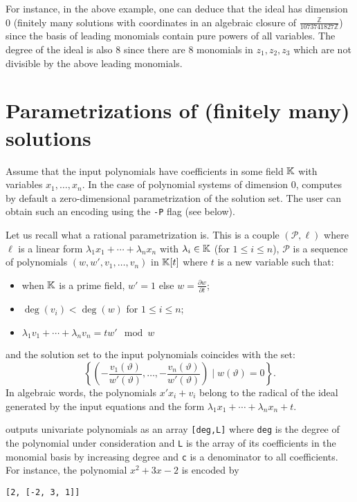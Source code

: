 \documentclass[a4paper,english,11pt]{scrartcl}
\theoremstyle{definition}
\theoremstyle{remark}
\def\leq{\leqslant}
\begin{document}
For instance, in the above example, one can deduce that the ideal has dimension
$0$ (finitely many solutions with coordinates in an algebraic closure of
$\frac{\mathbb{Z}}{1073741827\mathbb{Z}}$) since the basis of leading monomials
contain pure powers of all variables. The degree of the ideal is also $8$ since
there are $8$ monomials in $z_1, z_2, z_3$ which are not divisible by the above
leading monomials.

\section{Parametrizations of (finitely many) solutions}

Assume that the input polynomials have coefficients in some field $\mathbb{K}$ with
variables $x_1, \ldots, x_n$. In the case of polynomial systems of dimension
$0$, \msolve computes by default a zero-dimensional parametrization of the
solution set. The user can obtain such an encoding using the \verb+-P+ flag 
(see below).

Let us recall what a rational parametrization is.
This is a couple $(\mathscr{P}, \ell)$ where $\ell$ is a linear form $\lambda_1
x_1 + \cdots + \lambda_n x_n$ with $\lambda_i\in \mathbb{K}$ (for $1\leq i \leq n$),
$\mathscr{P}$ is a sequence of polynomials $(w, w', v_1, \ldots, v_n)$ in
$\mathbb{K}[t]$ where $t$ is a new variable such that:
\begin{itemize}
\item when $\mathbb{K}$ is a prime field, $w'=1$ else $w = \frac{\partial w}{\partial
    t}$;
\item $\deg(v_i) < \deg(w)$ for $1\leq i \leq n$;
\item $\lambda_1 v_1 +\cdots +\lambda_n v_n = tw' \mod w$
\end{itemize}
and the solution set to the input polynomials coincides with the set:
\[
\left \{\left (-\frac{v_1(\vartheta)}{w'(\vartheta)}, \ldots,
  -\frac{v_n(\vartheta)}{w'(\vartheta)}\right ) \mid w(\vartheta) = 0
\right\}.
\]
In algebraic words, the polynomials \(x' x_i + v_i\) belong to the radical of the 
ideal generated by the input equations and the form \(\lambda_1 x_1 + \cdots +
\lambda_n x_n + t\). 

\msolve outputs univariate polynomials as an array \verb+[deg,L]+ where
\verb+deg+ is the degree of the polynomial under consideration and \verb+L+ is
the array of its coefficients in the monomial basis by increasing degree and 
\verb+c+ is a denominator to all coefficients. For instance, the polynomial 
\(x^2+3x-2\) is encoded by 
\begin{verbatim}
[2, [-2, 3, 1]]
\end{verbatim}
\end{document}
